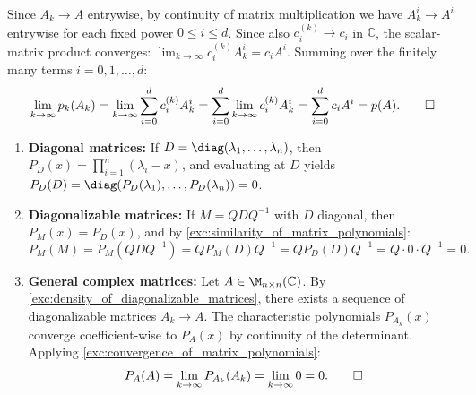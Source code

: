 \begin{exercisesolution}
\label{sol:convergence_of_matrix_polynomials}
Since $A_k \to A$ entrywise, by continuity of matrix multiplication we have $A_k^i \to A^i$ entrywise for each fixed power $0 \le i \le d$.
Since also $c_i^{(k)} \to c_i$ in $\mathbb{C}$, the scalar-matrix product converges: $\lim_{k \to \infty} c_i^{(k)} A_k^i = c_i A^i$.
Summing over the finitely many terms $i = 0, 1, \dots, d$:
\[
\lim_{k \to \infty} p_k(A_k) = \lim_{k \to \infty} \sum_{i=0}^d c_i^{(k)} A_k^i = \sum_{i=0}^d \lim_{k \to \infty} c_i^{(k)} A_k^i = \sum_{i=0}^d c_i A^i = p(A). \qedhere
\]
\end{exercisesolution}

\begin{exercisesolution}
\label{sol:cayley_hamilton_via_density}
\begin{enumerate}
    \item \textbf{Diagonal matrices:} If $D = \diag(\lambda_1, \dots, \lambda_n)$, then $P_D(x) = \prod_{i=1}^n (\lambda_i - x)$, and evaluating at $D$ yields $P_D(D) = \diag(P_D(\lambda_1), \dots, P_D(\lambda_n)) = 0$.
    \item \textbf{Diagonalizable matrices:} If $M = Q D Q^{-1}$ with $D$ diagonal, then $P_M(x) = P_D(x)$, and by \cref{exc:similarity_of_matrix_polynomials}:
    \[
    P_M(M) = P_M(Q D Q^{-1}) = Q P_M(D) Q^{-1} = Q P_D(D) Q^{-1} = Q \cdot 0 \cdot Q^{-1} = 0.
    \]
    \item \textbf{General complex matrices:} Let $A \in \M_{n \times n}(\mathbb{C})$. By \cref{exc:density_of_diagonalizable_matrices}, there exists a sequence of diagonalizable matrices $A_k \to A$.
    The characteristic polynomials $P_{A_k}(x)$ converge coefficient-wise to $P_A(x)$ by continuity of the determinant.
    Applying \cref{exc:convergence_of_matrix_polynomials}:
    \[
    P_A(A) = \lim_{k \to \infty} P_{A_k}(A_k) = \lim_{k \to \infty} 0 = 0. \qedhere
    \]
\end{enumerate}
\end{exercisesolution}

